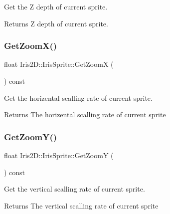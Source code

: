 Get the Z depth of current sprite. 

\begin{DoxyReturn}{Returns}
Z depth of current sprite. 
\end{DoxyReturn}
\mbox{\label{class_iris2_d_1_1_iris_sprite_a1cb9fb2549f00ef1efab204f0d222aeb}} 
\subsubsection{\texorpdfstring{Get\+Zoom\+X()}{GetZoomX()}}
{\footnotesize\ttfamily float Iris2\+D\+::\+Iris\+Sprite\+::\+Get\+ZoomX (\begin{DoxyParamCaption}{ }\end{DoxyParamCaption}) const}



Get the horizental scalling rate of current sprite. 

\begin{DoxyReturn}{Returns}
The horizental scalling rate of current sprite 
\end{DoxyReturn}
\mbox{\label{class_iris2_d_1_1_iris_sprite_a350aab21a9e40f7d26b8d757d26e4df2}} 
\subsubsection{\texorpdfstring{Get\+Zoom\+Y()}{GetZoomY()}}
{\footnotesize\ttfamily float Iris2\+D\+::\+Iris\+Sprite\+::\+Get\+ZoomY (\begin{DoxyParamCaption}{ }\end{DoxyParamCaption}) const}



Get the vertical scalling rate of current sprite. 

\begin{DoxyReturn}{Returns}
The vertical scalling rate of current sprite 
\end{DoxyReturn}
\mbox{\label{class_iris2_d_1_1_iris_sprite_aa225c6483e0282375187b092ea0cecf9}} 
